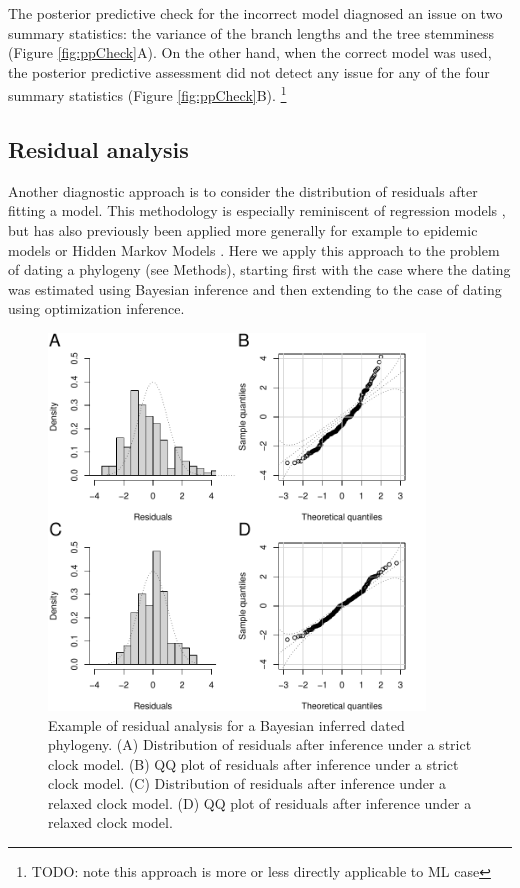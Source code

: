 \documentclass{article}
\begin{document}
The posterior predictive check for the incorrect model diagnosed an issue on
two summary statistics: the variance of the branch lengths and the tree 
stemminess (Figure \ref{fig:ppCheck}A). On the other hand, when the correct model was
used, the posterior predictive assessment did not detect any issue for any of the four
summary statistics (Figure \ref{fig:ppCheck}B). 
\footnote{TODO: note this approach is more or less directly applicable to ML case}

\subsection*{Residual analysis}

Another diagnostic approach is to consider the distribution of residuals after fitting a model.
This methodology is especially reminiscent of regression models
\citep{coxGeneralDefinitionResiduals1968,dunnRandomizedQuantileResiduals1996},
but has also previously been applied more generally for example to
epidemic models \citep{lauNewModelDiagnostics2014} or 
Hidden Markov Models \citep{zucchini2009hidden,buckbyModelCheckingHidden2020}.
Here we apply this approach to the problem of dating a phylogeny (see Methods), starting first with the case
where the dating was estimated using Bayesian inference and then extending to the case of 
dating using optimization inference. 

\begin{figure}[p!]
\begin{center}
\includegraphics[width=10cm]{exampleResid.pdf}
\end{center}
\caption{Example of residual analysis for a Bayesian inferred dated phylogeny.
(A) Distribution of residuals after inference under a strict clock model. 
(B) QQ plot of residuals after inference under a strict clock model.
(C) Distribution of residuals after inference under a relaxed clock model. 
(D) QQ plot of residuals after inference under a relaxed clock model.
\label{fig:exampleResid}}
\end{figure}
\end{document}
